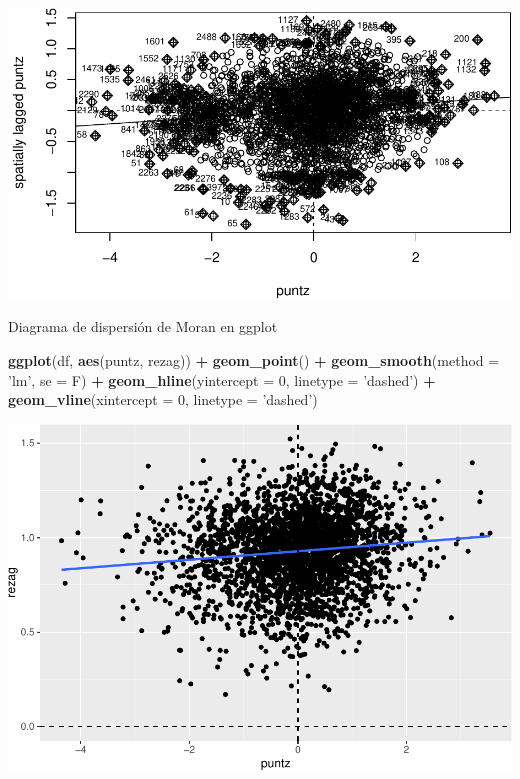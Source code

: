 \documentclass[11pt,]{article}
\newenvironment{Shaded}{\begin{snugshade}}{\end{snugshade}}
\newcommand{\KeywordTok}[1]{\textcolor[rgb]{0.13,0.29,0.53}{\textbf{#1}}}
\newcommand{\DataTypeTok}[1]{\textcolor[rgb]{0.13,0.29,0.53}{#1}}
\newcommand{\DecValTok}[1]{\textcolor[rgb]{0.00,0.00,0.81}{#1}}
\newcommand{\StringTok}[1]{\textcolor[rgb]{0.31,0.60,0.02}{#1}}
\newcommand{\OperatorTok}[1]{\textcolor[rgb]{0.81,0.36,0.00}{\textbf{#1}}}
\newcommand{\NormalTok}[1]{#1}
\begin{document}
\includegraphics{proyecto_f_files/figure-latex/unnamed-chunk-80-1.pdf}

Diagrama de dispersión de Moran en ggplot

\begin{Shaded}
\begin{Highlighting}[]
\KeywordTok{ggplot}\NormalTok{(df, }\KeywordTok{aes}\NormalTok{(puntz, rezag)) }\OperatorTok{+}
\StringTok{  }\KeywordTok{geom_point}\NormalTok{() }\OperatorTok{+}\StringTok{ }\KeywordTok{geom_smooth}\NormalTok{(}\DataTypeTok{method =} \StringTok{'lm'}\NormalTok{, }\DataTypeTok{se =}\NormalTok{ F) }\OperatorTok{+}
\StringTok{  }\KeywordTok{geom_hline}\NormalTok{(}\DataTypeTok{yintercept =} \DecValTok{0}\NormalTok{, }\DataTypeTok{linetype =} \StringTok{'dashed'}\NormalTok{) }\OperatorTok{+}
\StringTok{  }\KeywordTok{geom_vline}\NormalTok{(}\DataTypeTok{xintercept =} \DecValTok{0}\NormalTok{, }\DataTypeTok{linetype =} \StringTok{'dashed'}\NormalTok{)}
\end{Highlighting}
\end{Shaded}

\includegraphics{proyecto_f_files/figure-latex/unnamed-chunk-81-1.pdf}
\end{document}
